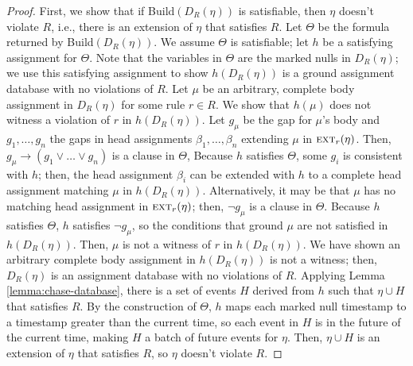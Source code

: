 \begin{proof}
First,
we show that
if {\sf Build}$(D_{R}(\eta))$ is satisfiable,
then $\eta$ doesn't violate $R$,
i.e., there is an extension of $\eta$ that satisfies $R$.
Let $\Theta$ be the formula returned by {\sf Build}$(D_{R}(\eta))$.
We assume $\Theta$ is satisfiable;
let $h$ be a satisfying assignment for $\Theta$.
Note that the variables in $\Theta$ are the marked nulls in $D_{R}(\eta)$;
we use this satisfying assignment to show $h(D_{R}(\eta))$ is a ground assignment database
with no violations of $R$.
Let $\mu$ be an arbitrary, complete body assignment
in $D_{R}(\eta)$ for some rule $r\in R$.
We show that $h(\mu)$ does not witness a violation
of $r$ in $h(D_{R}(\eta))$.
Let $g_\mu$ be the gap for $\mu$'s body
and $g_1,\dots,g_n$ the gaps in head assignments $\beta_1,\dots,\beta_n$
extending $\mu$ in $\textsc{ext}_{r}(\eta)$.
Then, $g_\mu\rightarrow (g_1 \lor\dots\lor g_n)$ is a clause in $\Theta$,
Because $h$ satisfies $\Theta$,
some $g_i$ is consistent with $h$;
then, the head assignment $\beta_i$ can be extended with $h$
to a complete head assignment matching $\mu$ in $h(D_{R}(\eta))$.
Alternatively,
it may be that $\mu$ has no matching head assignment in $\textsc{ext}_{r}(\eta)$;
then,
$\neg g_\mu$ is a clause in $\Theta$.
Because $h$ satisfies $\Theta$,
$h$ satisfies $\neg g_\mu$,
so the conditions that ground $\mu$ are not satisfied in $h(D_{R}(\eta))$.
Then, $\mu$ is not a witness of $r$ in $h(D_{R}(\eta))$.
We have shown an arbitrary complete body assignment in $h(D_{R}(\eta))$ is not a witness;
then,
$D_{R}(\eta)$ is an assignment database
with no violations of $R$.
Applying Lemma\,\ref{lemma:chase-database},
there is a set of events $H$ derived from $h$
such that $\eta\cup H$ that satisfies $R$.
By the construction of $\Theta$,
$h$ maps each marked null timestamp to a timestamp greater
than the current time,
so each event in $H$ is in the future of the current time,
making $H$ a batch of future events for $\eta$.
Then, $\eta\cup H$ is an extension of $\eta$ that satisfies $R$,
so $\eta$ doesn't violate $R$.


\end{proof}
